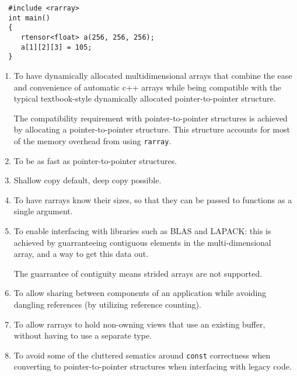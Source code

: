 \documentclass[11pt,twoside]{article}
\begin{document}
\begin{framed}\vspace{-14pt}%
\begin{verbatim}
  #include <rarray>
  int main() 
  {
     rtensor<float> a(256, 256, 256);
     a[1][2][3] = 105;
  }
\end{verbatim}%
\vspace{-14pt}%
\end{framed}


\begin{enumerate}\itemsep1pt\parskip3pt
 
\item To have dynamically allocated multidimensional arrays that
combine the ease and convenience of automatic c++ arrays while being compatible
with the
typical textbook-style dynamically allocated pointer-to-pointer
structure. 

The compatibility requirement with pointer-to-pointer structures
is achieved by allocating a pointer-to-pointer structure. This
structure accounts for most of the memory overhead from using \texttt{rarray}.

\item To be as fast as pointer-to-pointer structures.

\item Shallow copy default, deep copy possible.
  
\item To have rarrays know their sizes, so that they can be passed to
functions as a single argument. 

\item To enable interfacing with libraries such as BLAS and LAPACK: this
  is achieved by guarranteeing contiguous elements in the
  multi-dimensional array, and a way to get this data out.

  The guarrantee of contiguity means strided arrays are not supported.

\item To allow sharing between components of an application while avoiding dangling references (by utilizing reference counting).

\item To allow rarrays to hold non-owning views that use an existing buffer,
  without having to use a separate type.

\item To avoid some of the cluttered sematics around \texttt{const}
  correctness when converting to pointer-to-pointer structures when
  interfacing with legacy code.

\end{enumerate}
\end{document}
